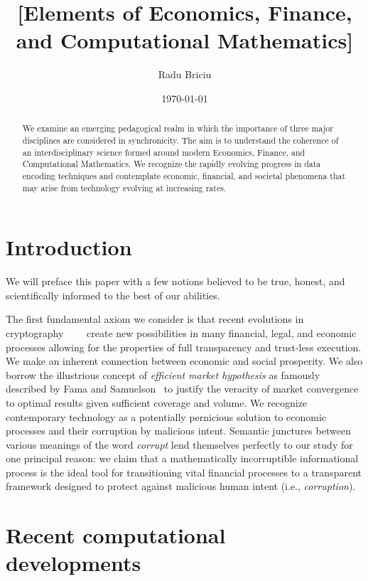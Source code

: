 \documentclass[11pt]{article}
\title{[Elements of Economics, Finance, and Computational Mathematics]}
\date{\today}
\author{Radu Briciu}
\begin{document}
\nocite{*}
\maketitle
\newpage
\begin{abstract}
	\noindent
	We examine an emerging pedagogical realm in which the importance of three major disciplines are considered in synchronicity. The aim is to understand the coherence of an interdisciplinary science formed around modern Economics, Finance, and Computational Mathematics. We recognize the rapidly evolving progress in data encoding techniques and contemplate economic, financial, and societal phenomena that may arise from technology evolving at increasing rates.
\end{abstract}
\newpage
\tableofcontents	
\newpage

\section{Introduction}

We will preface this paper with a few notions believed to be true, honest, and scientifically informed to the best of our abilities.

The first fundamental axiom we consider is that recent evolutions in cryptography~\cite{ernstberger_2024_do}~\cite{kuznetsov_2024_enhanced}~\cite{nadler_2023_tornado}~\cite{shahlaatapoor_2023_vss} create new possibilities in many financial, legal, and economic processes allowing for the properties of full transparency and trust-less execution. We make an inherent connection between economic and social prosperity. We also borrow the illustrious concept of \textit{efficient market hypothesis} as famously described by Fama and Samuelson~\cite{delcey_2019_samuelson} to justify the veracity of market convergence to optimal results given sufficient coverage and volume. We recognize contemporary technology as a potentially pernicious solution to economic processes and their corruption by malicious intent. Semantic junctures between various meanings of the word \textit{corrupt} lend themselves perfectly to our study for one principal reason: we claim that a mathematically incorruptible informational process is the ideal tool for transitioning vital financial processes to a transparent framework designed to protect against malicious human intent (i.e., \textit{corruption}).

\section{Recent computational developments}
\end{document}
